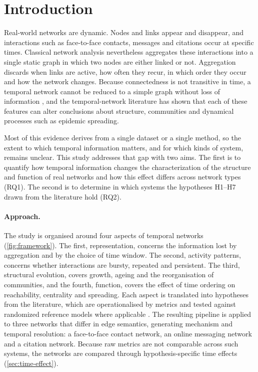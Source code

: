 \section{Introduction}
\label{sec:intro}
Real-world networks are dynamic. Nodes and links appear and disappear, and interactions
such as face-to-face contacts, messages and citations occur at specific times. Classical
network analysis nevertheless aggregates these interactions into a single static graph in
which two nodes are either linked or not. Aggregation discards when links are active, how
often they recur, in which order they occur and how the network changes. Because
connectedness is not transitive in time, a temporal network cannot be reduced to a simple
graph without loss of information \citep{holme2015modern}, and the temporal-network
literature \citep{holme2012temporal,holme2015modern,masuda2016guide} has shown that each of
these features can alter conclusions about structure, communities and dynamical processes
such as epidemic spreading.

Most of this evidence derives from a single dataset or a single method, so the extent to
which temporal information matters, and for which kinds of system, remains unclear. This
study addresses that gap with two aims. The first is to quantify how temporal information
changes the characterization of the structure and function of real networks and how this
effect differs across network types (RQ1). The second is to determine in which systems the
hypotheses H1--H7 drawn from the literature hold (RQ2).

\paragraph{Approach.}
The study is organised around four aspects of temporal networks (\cref{fig:framework}). The
first, representation, concerns the information lost by aggregation and by the choice of
time window. The second, activity patterns, concerns whether interactions are bursty,
repeated and persistent. The third, structural evolution, covers growth, ageing and the
reorganisation of communities, and the fourth, function, covers the effect of time ordering
on reachability, centrality and spreading. Each aspect is translated into hypotheses from
the literature, which are operationalised by metrics and tested against randomized reference models where applicable \citep{gauvin2022randomized}. The resulting pipeline is applied to three
networks that differ in edge semantics, generating mechanism and temporal resolution: a
face-to-face contact network, an online messaging network and a citation network. Because
raw metrics are not comparable across such systems, the networks are compared through
hypothesis-specific time effects (\cref{sec:time-effect}).

